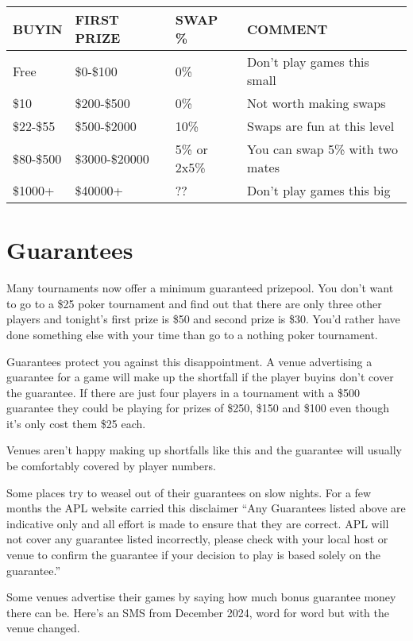 \begin{tabular}{|l|l|l|l|} \hline
BUYIN      & FIRST PRIZE    & SWAP \% & COMMENT\\ \hline
Free       & \$0-\$100      & 0\%     & Don't play games this small \\ \hline
\$10       & \$200-\$500    & 0\%     & Not worth making swaps \\ \hline
\$22-\$55  & \$500-\$2000   & 10\%    & Swaps are fun at this level \\ \hline
\$80-\$500 & \$3000-\$20000 & 5\% or 2x5\% & You can swap 5\% with two mates \\ \hline
\$1000+    & \$40000+ & ?? & Don't play games this big \\ \hline
\end{tabular}

\section{Guarantees}

Many tournaments now offer a minimum guaranteed prizepool. You
don't want to go to a \$25 poker tournament and find out that there
are only three other players and tonight's first prize is \$50 and
second prize is \$30. You'd rather have done something else with your
time than go to a nothing poker tournament.

Guarantees protect you against this disappointment. A venue
advertising a guarantee for a game will make up the shortfall if the
player buyins don't cover the guarantee. If there are just four
players in a tournament with a \$500 guarantee they could be playing
for prizes of \$250, \$150 and \$100 even though it's only cost them
\$25 each.

Venues aren't happy making up shortfalls like this and the guarantee
will usually be comfortably covered by player numbers.

Some places try to weasel out of their guarantees on slow nights.
For a few months the APL website carried this disclaimer
``Any Guarantees listed above are indicative only and all effort
is made to ensure that they are correct. APL will not cover
any guarantee listed incorrectly, please check with your local
host or venue to confirm the guarantee if your decision to
play is based solely on the guarantee.''

Some venues advertise their games by saying how much bonus
guarantee money there can be. Here's an SMS from December 2024,
word for word but with the venue changed.

